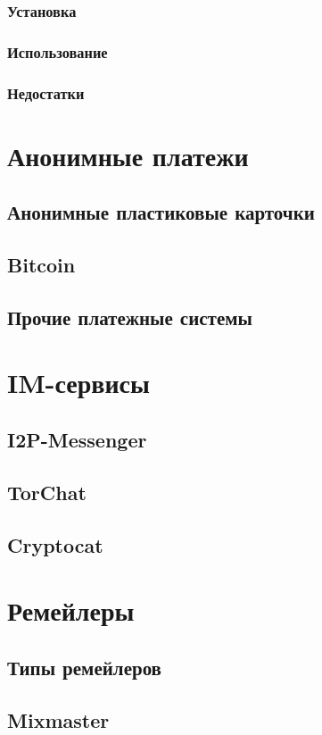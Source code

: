 \subsubsection{Установка}
\subsubsection{Использование}
\subsubsection{Недостатки}

\section{Анонимные платежи}
\subsection{Анонимные пластиковые карточки}
\subsection{Bitcoin}
\subsection{Прочие платежные системы}

\section{IM-сервисы}
\subsection{I2P-Messenger}
\subsection{TorChat}
\subsection{Cryptocat}

\section{Ремейлеры}
\subsection{Типы ремейлеров}
\subsection{Mixmaster}
